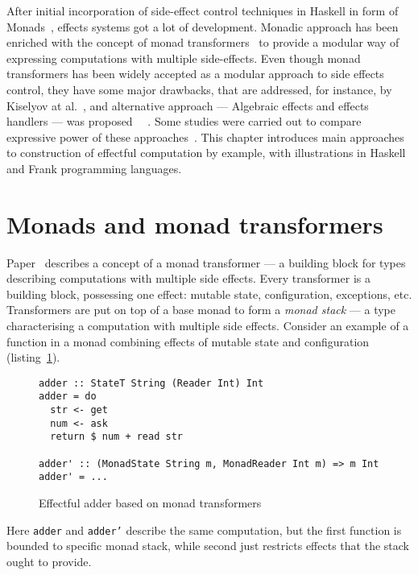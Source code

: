   After initial incorporation of side-effect control techniques in Haskell in
  form of Monads~\cite{Wadler:1992:EFP:143165.143169}, effects systems got a lot
  of development. Monadic approach has been enriched with the concept of monad
  transformers~\cite{Liang:1995:MTM:199448.199528} to provide a modular way of
  expressing computations with multiple side-effects. Even though monad
  transformers has been widely accepted as a modular approach to side effects control,
  they have some major drawbacks, that are addressed, for instance, by Kiselyov at al.~\cite{Kiselyov:2013:EEA:2578854.2503791}, and alternative approach --- Algebraic effects and effects handlers --- was proposed~\cite{DBLP:journals/jlp/BauerP15}
  ~\cite{Kiselyov:2013:EEA:2578854.2503791}. Some studies were carried out to
  compare expressive power of these approaches~\cite{DBLP:journals/corr/ForsterKLP16}.
  This chapter introduces main approaches to construction of effectful computation
  by example, with illustrations in Haskell and Frank programming languages.

  \section{Monads and monad transformers}

  Paper~\cite{Liang:1995:MTM:199448.199528} describes a concept of a monad
  transformer --- a building block for types describing computations with
  multiple side effects. Every transformer is a building block, possessing one
  effect: mutable state, configuration, exceptions, etc.
  Transformers are put on top of a base monad to form a \emph{monad stack} --- a
  type characterising a computation with multiple side effects. Consider
  an example of a function in a monad combining effects of mutable state and
  configuration (listing~\ref{listing:mtlAdder}).

  \begin{figure}[h]
  \begin{lstlisting}
adder :: StateT String (Reader Int) Int
adder = do
  str <- get
  num <- ask
  return $ num + read str

adder' :: (MonadState String m, MonadReader Int m) => m Int
adder' = ...
  \end{lstlisting}
  \caption{Effectful adder based on monad transformers}
  \label{listing:mtlAdder}
  \end{figure}

  Here \texttt{adder} and \texttt{adder'} describe the same computation, but the first
  function is bounded to specific monad stack, while second just restricts effects
  that the stack ought to provide.

